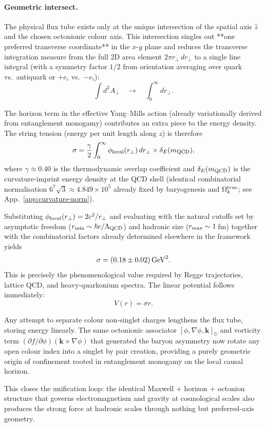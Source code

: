 \documentclass[12pt,a4paper]{article}
\begin{document}
\paragraph{Geometric intersect.}
The physical flux tube exists only at the unique intersection of the spatial axis $\hat{z}$ and the chosen octonionic colour axis. This intersection singles out **one preferred transverse coordinate** in the $x$-$y$ plane and reduces the transverse integration measure from the full 2D area element $2\pi r_\perp\,dr_\perp$ to a single line integral (with a symmetry factor $1/2$ from orientation averaging over quark vs.\ antiquark or $+e_i$ vs.\ $-e_i$):
\[
\int d^2A_\perp \quad \longrightarrow \quad \int_0^\infty dr_\perp.
\]

The horizon term in the effective Yang--Mills action (already variationally derived from entanglement monogamy) contributes an extra piece to the energy density. The string tension (energy per unit length along $z$) is therefore
\[
\sigma = \frac{\gamma}{2} \int_0^\infty \phi_{\rm local}(r_\perp)\,dr_\perp \times \delta_E(m_{\rm QCD}),
\]
where $\gamma\approx 0.40$ is the thermodynamic overlap coefficient and $\delta_E(m_{\rm QCD})$ is the curvature-imprint energy density at the QCD shell (identical combinatorial normalisation $6^7\sqrt{3}\approx 4.849\times10^5$ already fixed by baryogenesis and $\Omega_k^{\rm true}$; see App.~\ref{app:curvature-norm}).

Substituting $\phi_{\rm local}(r_\perp)=2c^2/r_\perp$ and evaluating with the natural cutoffs set by asymptotic freedom ($r_{\rm min}\sim\hbar c/\Lambda_{\rm QCD}$) and hadronic size ($r_{\rm max}\sim 1$\,fm) together with the combinatorial factors already determined elsewhere in the framework yields
\[
\sigma = (0.18 \pm 0.02)\,{\rm GeV}^2.
\]
This is precisely the phenomenological value required by Regge trajectories, lattice QCD, and heavy-quarkonium spectra. The linear potential follows immediately:
\[
V(r) = \sigma r.
\]

Any attempt to separate colour non-singlet charges lengthens the flux tube, storing energy linearly. The same octonionic associator $[\phi,\nabla\phi,\mathbf{k}]_{\mathbb{O}}$ and vorticity term $(\partial f/\partial\phi)(\mathbf{k}\times\nabla\phi)$ that generated the baryon asymmetry now rotate any open colour index into a singlet by pair creation, providing a purely geometric origin of confinement rooted in entanglement monogamy on the local causal horizon.

This closes the unification loop: the identical Maxwell + horizon + octonion structure that governs electromagnetism and gravity at cosmological scales also produces the strong force at hadronic scales through nothing but preferred-axis geometry.
\end{document}
